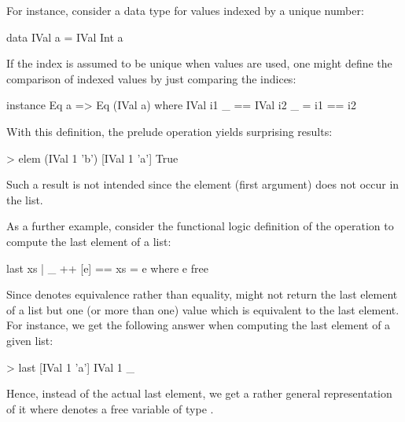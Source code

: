 For instance, consider a data type for values indexed by a unique
number:
%
\begin{curry}
data IVal a = IVal Int a
\end{curry}
%
If the index is assumed to be unique when  values are used,
one might define the comparison
of indexed values by just comparing the indices:
%
\begin{curry}
instance Eq a => Eq (IVal a) where
  IVal i1 _ == IVal i2 _  =  i1 == i2
\end{curry}
%
With this definition, the prelude operation 
yields surprising results:
%
\begin{curry}
> elem (IVal 1 'b') [IVal 1 'a']
True
\end{curry}
%
Such a result is not intended since the element (first argument)
does not occur in the list.

As a further example, consider the functional logic definition
of the operation  to compute the last element of a list:
%
\begin{curry}
last xs | _ ++ [e] == xs = e
  where e free
\end{curry}
%
Since \ccode{==} denotes equivalence rather than equality,
 might not return the last element of a list
but one (or more than one) value which is equivalent to the
last element.
For instance, we get the following answer when computing the last element
of a given  list:
%
\begin{curry}
> last [IVal 1 'a']
IVal 1 _
\end{curry}
%
Hence, instead of the actual last element, we get a rather general
representation of it where \ccode{\us} denotes a free variable
of type .

